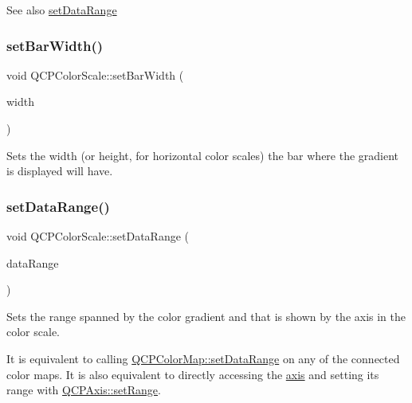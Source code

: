 \begin{DoxySeeAlso}{See also}
\hyperlink{class_q_c_p_color_scale_abe88633003a26d1e756aa74984587fef}{set\+Data\+Range} 
\end{DoxySeeAlso}
\mbox{\label{class_q_c_p_color_scale_ab9dcc0c1cd583477496209b1413bcb99}} 
\subsubsection{\texorpdfstring{set\+Bar\+Width()}{setBarWidth()}}
{\footnotesize\ttfamily void Q\+C\+P\+Color\+Scale\+::set\+Bar\+Width (\begin{DoxyParamCaption}\item[{int}]{width }\end{DoxyParamCaption})}

Sets the width (or height, for horizontal color scales) the bar where the gradient is displayed will have. \mbox{\label{class_q_c_p_color_scale_abe88633003a26d1e756aa74984587fef}} 
\subsubsection{\texorpdfstring{set\+Data\+Range()}{setDataRange()}}
{\footnotesize\ttfamily void Q\+C\+P\+Color\+Scale\+::set\+Data\+Range (\begin{DoxyParamCaption}\item[{const \hyperlink{class_q_c_p_range}{Q\+C\+P\+Range} \&}]{data\+Range }\end{DoxyParamCaption})}

Sets the range spanned by the color gradient and that is shown by the axis in the color scale.

It is equivalent to calling \hyperlink{class_q_c_p_color_map_a980b42837821159786a85b4b7dcb8774}{Q\+C\+P\+Color\+Map\+::set\+Data\+Range} on any of the connected color maps. It is also equivalent to directly accessing the \hyperlink{class_q_c_p_color_scale_a39bdbdb3b212602a5a57f9f3ea444190}{axis} and setting its range with \hyperlink{class_q_c_p_axis_aebdfea5d44c3a0ad2b4700cd4d25b641}{Q\+C\+P\+Axis\+::set\+Range}.

